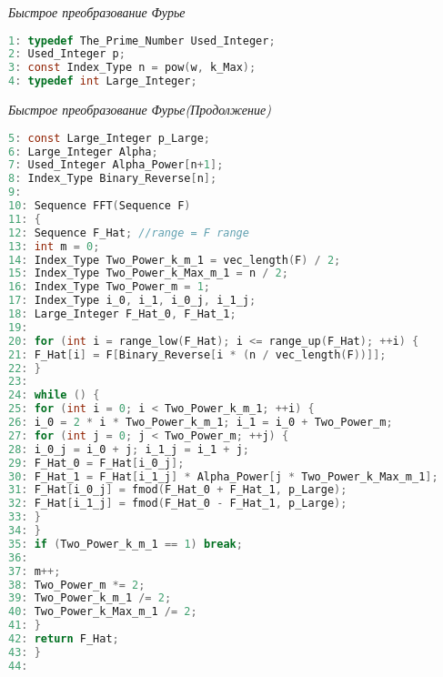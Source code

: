 \documentclass{mai_book}
\begin{document}
	\textit{Быстрое преобразование Фурье}
\begin{lstlisting}[language=C,
basicstyle=\scriptsize,
linewidth=7cm,
belowskip=-1em,
mathescape=true]
1: typedef The_Prime_Number Used_Integer;
2: Used_Integer p;
3: const Index_Type n = pow(w, k_Max);
4: typedef int Large_Integer;
\end{lstlisting}
	
	\newpage
	
   
   \textit{Быстрое преобразование Фурье(Продолжение)}
\begin{lstlisting}[language=C,
basicstyle=\scriptsize,
linewidth=7cm,
belowskip=-1em,
mathescape=true]
5: const Large_Integer p_Large;
6: Large_Integer Alpha;
7: Used_Integer Alpha_Power[n+1];
8: Index_Type Binary_Reverse[n];
9:
10: Sequence FFT(Sequence F)
11: {
12: Sequence F_Hat; //range = F range
13: int m = 0;
14: Index_Type Two_Power_k_m_1 = vec_length(F) / 2;
15: Index_Type Two_Power_k_Max_m_1 = n / 2;
16: Index_Type Two_Power_m = 1;
17: Index_Type i_0, i_1, i_0_j, i_1_j;
18: Large_Integer F_Hat_0, F_Hat_1;
19:
20: for (int i = range_low(F_Hat); i <= range_up(F_Hat); ++i) {
21: F_Hat[i] = F[Binary_Reverse[i * (n / vec_length(F))]];
22: }
23:
24: while () {
25: for (int i = 0; i < Two_Power_k_m_1; ++i) {
26: i_0 = 2 * i * Two_Power_k_m_1; i_1 = i_0 + Two_Power_m;
27: for (int j = 0; j < Two_Power_m; ++j) {
28: i_0_j = i_0 + j; i_1_j = i_1 + j;
29: F_Hat_0 = F_Hat[i_0_j];
30: F_Hat_1 = F_Hat[i_1_j] * Alpha_Power[j * Two_Power_k_Max_m_1];
31: F_Hat[i_0_j] = fmod(F_Hat_0 + F_Hat_1, p_Large);
32: F_Hat[i_1_j] = fmod(F_Hat_0 - F_Hat_1, p_Large);
33: }
34: }
35: if (Two_Power_k_m_1 == 1) break;
36:
37: m++;
38: Two_Power_m *= 2;
39: Two_Power_k_m_1 /= 2;
40: Two_Power_k_Max_m_1 /= 2;
41: }
42: return F_Hat;
43: }
44:
\end{lstlisting}
	
	\newpage 
	
	
\end{document}
